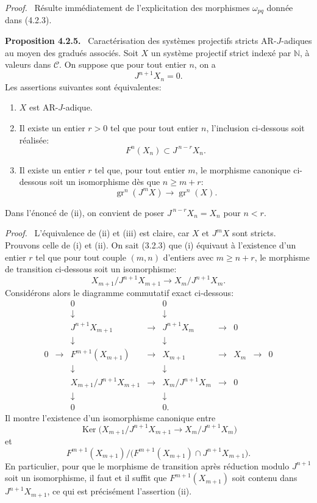 \documentclass[11pt]{article}
\newenvironment{statement}[1]{\par\medskip\noindent\textbf{#1.}\ }{\par\medskip}
\newenvironment{prooftext}[1][Proof]{\par\noindent\emph{#1.}\ }{\par\medskip}
\providecommand{\Ker}{\operatorname{Ker}}
\providecommand{\gr}{\operatorname{gr}}
\providecommand{\Ker}{\operatorname{Ker}}
\providecommand{\gr}{\operatorname{gr}}
\providecommand{\gr}{\operatorname{gr}}
\providecommand{\Ker}{\operatorname{Ker}}
\begin{document}
\begin{prooftext}
Résulte immédiatement de l'explicitation des morphismes \(\omega_{pq}\) donnée dans (4.2.3).
\end{prooftext}

\begin{statement}{Proposition 4.2.5}
Caractérisation des systèmes projectifs stricts AR-\(J\)-adiques au moyen des gradués associés. Soit \(X\) un système projectif strict indexé par \(\mathbb N\), à valeurs dans \(\mathcal C\). On suppose que pour tout entier \(n\), on a
\[
J^{n+1}X_n=0.
\]
Les assertions suivantes sont équivalentes:
\begin{enumerate}[label=\textup{(\roman*)}]
\item \(X\) est AR-\(J\)-adique.
\item Il existe un entier \(r>0\) tel que pour tout entier \(n\), l'inclusion ci-dessous soit réalisée:
\[
F^n(X_n)\subset J^{\,n-r}X_n.
\]
\item Il existe un entier \(r\) tel que, pour tout entier \(m\), le morphisme canonique ci-dessous soit un isomorphisme dès que \(n\ge m+r\):
\[
\gr^n(J^mX)\longrightarrow \gr^n(X).
\]
\end{enumerate}
Dans l'énoncé de (ii), on convient de poser \(J^{\,n-r}X_n=X_n\) pour \(n<r\).
\end{statement}

\begin{prooftext}
L'équivalence de (ii) et (iii) est claire, car \(X\) et \(J^mX\) sont stricts. Prouvons celle de (i) et (ii). On sait (3.2.3) que (i) équivaut à l'existence d'un entier \(r\) tel que pour tout couple \((m,n)\) d'entiers avec \(m\ge n+r\), le morphisme de transition ci-dessous soit un isomorphisme:
\[
X_{m+1}/J^{n+1}X_{m+1}\longrightarrow X_m/J^{n+1}X_m.
\]
Considérons alors le diagramme commutatif exact ci-dessous:
\[
\begin{array}{ccccccccccc}
&&0&&0\\
&&\downarrow&&\downarrow\\
&&J^{n+1}X_{m+1}&\longrightarrow&J^{n+1}X_m&\longrightarrow&0\\
&&\downarrow&&\downarrow\\
0&\longrightarrow&F^{m+1}(X_{m+1})&\longrightarrow&X_{m+1}&\longrightarrow&X_m&\longrightarrow&0\\
&&\downarrow&&\downarrow\\
&&X_{m+1}/J^{n+1}X_{m+1}&\longrightarrow&X_m/J^{n+1}X_m&\longrightarrow&0\\
&&\downarrow&&\downarrow\\
&&0&&0 .
\end{array}
\]
Il montre l'existence d'un isomorphisme canonique entre
\[
\Ker\bigl(X_{m+1}/J^{n+1}X_{m+1}
       \longrightarrow X_m/J^{n+1}X_m\bigr)
\]
et
\[
F^{m+1}(X_{m+1})/
\bigl(F^{m+1}(X_{m+1})\cap J^{n+1}X_{m+1}\bigr).
\]
En particulier, pour que le morphisme de transition après réduction modulo \(J^{n+1}\) soit un isomorphisme, il faut et il suffit que \(F^{m+1}(X_{m+1})\) soit contenu dans \(J^{n+1}X_{m+1}\), ce qui est précisément l'assertion (ii).
\end{prooftext}
\end{document}

